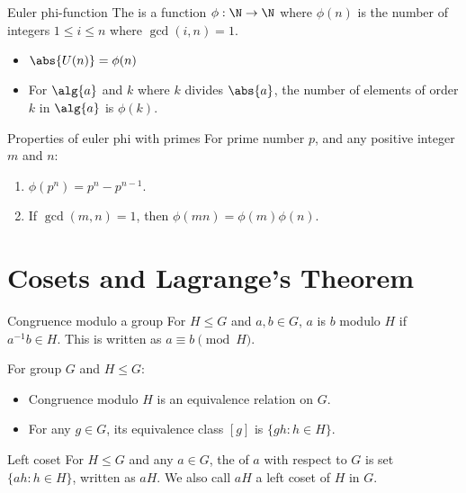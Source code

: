 \begin{dfnbox}{Euler phi-function}{}
    The  is a function $\phi : \N \to \N$ where $\phi(n)$ is the number of integers $1 \leq i \leq n$ where $\gcd(i, n) = 1$.
\end{dfnbox}


\begin{itemize}[noitemsep]
    \item $\abs{U(n)} = \phi(n)$
    \item For $\alg{a}$ and $k$ where $k$ divides $\abs{a}$, the number of elements of order $k$ in $\alg{a}$ is $\phi(k)$.
\end{itemize}

\begin{thmbox}{Properties of euler phi with primes}{}
    For prime number $p$, and any positive integer $m$ and $n$:
    \begin{enumerate}
        \item $\phi(p^n) = p^n - p^{n-1}$.
        \item If $\gcd(m,n) = 1$, then $\phi(mn) = \phi(m)\phi(n)$.
    \end{enumerate}
\end{thmbox}


\section{Cosets and Lagrange's Theorem}

\begin{dfnbox}{Congruence modulo a group}{}
    For $H \leq G$ and $a,b \in G$, $a$ is  $b$ modulo $H$ if $a^{-1}b \in H$. This is written as $a \equiv b \pmod{H}$.
\end{dfnbox}

For group $G$ and $H \leq G$:
\begin{itemize}[noitemsep]
    \item Congruence modulo $H$ is an equivalence relation on $G$.
    \item For any $g \in G$, its equivalence class $[g]$ is $\{gh : h \in H\}$.
\end{itemize}

\begin{dfnbox}{Left coset}{}
    For $H \leq G$ and any $a \in G$, the  of $a$ with respect to $G$ is set $\{ah : h \in H\}$, written as $aH$. We also call $aH$ a left coset of $H$ in $G$.
\end{dfnbox}

